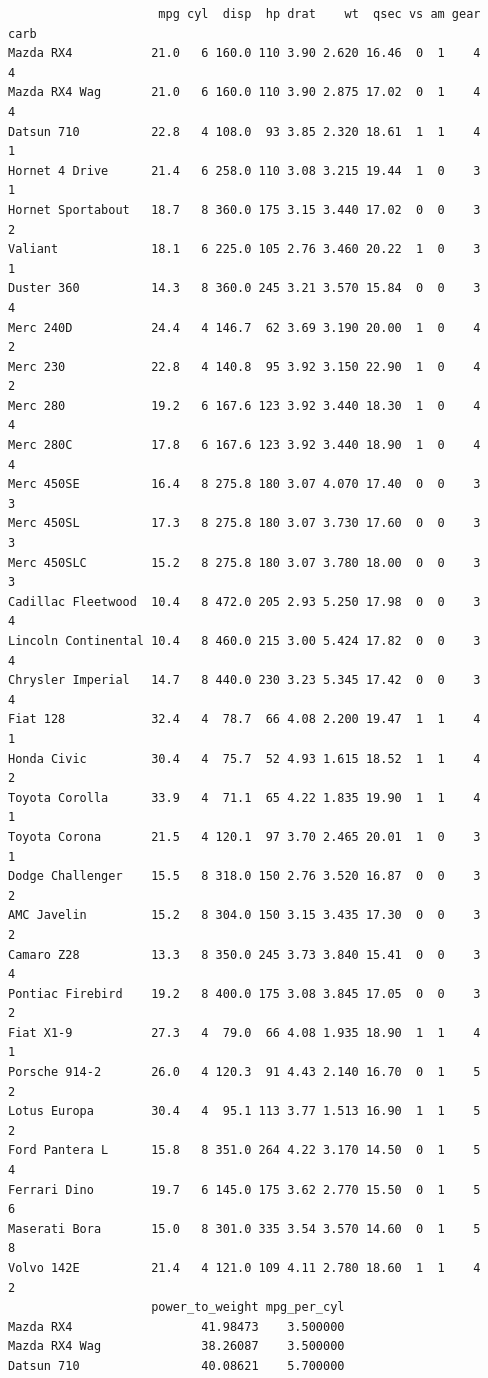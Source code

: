 \documentclass[
  letterpaper,
  DIV=11,
  numbers=noendperiod]{scrreprt}
\begin{document}
\begin{verbatim}
                     mpg cyl  disp  hp drat    wt  qsec vs am gear carb
Mazda RX4           21.0   6 160.0 110 3.90 2.620 16.46  0  1    4    4
Mazda RX4 Wag       21.0   6 160.0 110 3.90 2.875 17.02  0  1    4    4
Datsun 710          22.8   4 108.0  93 3.85 2.320 18.61  1  1    4    1
Hornet 4 Drive      21.4   6 258.0 110 3.08 3.215 19.44  1  0    3    1
Hornet Sportabout   18.7   8 360.0 175 3.15 3.440 17.02  0  0    3    2
Valiant             18.1   6 225.0 105 2.76 3.460 20.22  1  0    3    1
Duster 360          14.3   8 360.0 245 3.21 3.570 15.84  0  0    3    4
Merc 240D           24.4   4 146.7  62 3.69 3.190 20.00  1  0    4    2
Merc 230            22.8   4 140.8  95 3.92 3.150 22.90  1  0    4    2
Merc 280            19.2   6 167.6 123 3.92 3.440 18.30  1  0    4    4
Merc 280C           17.8   6 167.6 123 3.92 3.440 18.90  1  0    4    4
Merc 450SE          16.4   8 275.8 180 3.07 4.070 17.40  0  0    3    3
Merc 450SL          17.3   8 275.8 180 3.07 3.730 17.60  0  0    3    3
Merc 450SLC         15.2   8 275.8 180 3.07 3.780 18.00  0  0    3    3
Cadillac Fleetwood  10.4   8 472.0 205 2.93 5.250 17.98  0  0    3    4
Lincoln Continental 10.4   8 460.0 215 3.00 5.424 17.82  0  0    3    4
Chrysler Imperial   14.7   8 440.0 230 3.23 5.345 17.42  0  0    3    4
Fiat 128            32.4   4  78.7  66 4.08 2.200 19.47  1  1    4    1
Honda Civic         30.4   4  75.7  52 4.93 1.615 18.52  1  1    4    2
Toyota Corolla      33.9   4  71.1  65 4.22 1.835 19.90  1  1    4    1
Toyota Corona       21.5   4 120.1  97 3.70 2.465 20.01  1  0    3    1
Dodge Challenger    15.5   8 318.0 150 2.76 3.520 16.87  0  0    3    2
AMC Javelin         15.2   8 304.0 150 3.15 3.435 17.30  0  0    3    2
Camaro Z28          13.3   8 350.0 245 3.73 3.840 15.41  0  0    3    4
Pontiac Firebird    19.2   8 400.0 175 3.08 3.845 17.05  0  0    3    2
Fiat X1-9           27.3   4  79.0  66 4.08 1.935 18.90  1  1    4    1
Porsche 914-2       26.0   4 120.3  91 4.43 2.140 16.70  0  1    5    2
Lotus Europa        30.4   4  95.1 113 3.77 1.513 16.90  1  1    5    2
Ford Pantera L      15.8   8 351.0 264 4.22 3.170 14.50  0  1    5    4
Ferrari Dino        19.7   6 145.0 175 3.62 2.770 15.50  0  1    5    6
Maserati Bora       15.0   8 301.0 335 3.54 3.570 14.60  0  1    5    8
Volvo 142E          21.4   4 121.0 109 4.11 2.780 18.60  1  1    4    2
                    power_to_weight mpg_per_cyl
Mazda RX4                  41.98473    3.500000
Mazda RX4 Wag              38.26087    3.500000
Datsun 710                 40.08621    5.700000

\end{verbatim}
\end{document}
